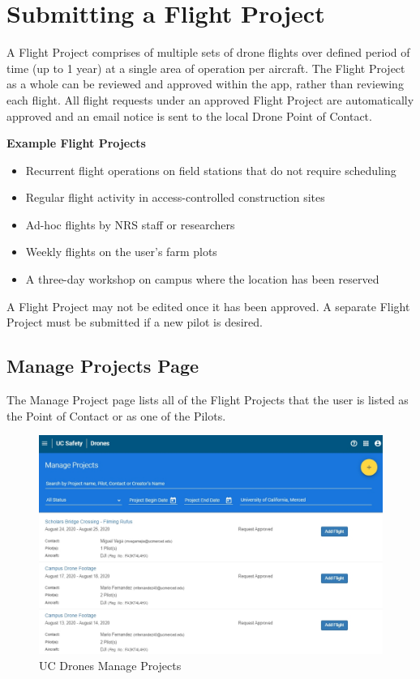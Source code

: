 \documentclass[
  12pt,
]{book}
\providecommand{\tightlist}{%
  \setlength{\itemsep}{0pt}\setlength{\parskip}{0pt}}
\begin{document}
\hypertarget{UCDrones-project}{%
\section{Submitting a Flight Project}\label{UCDrones-project}}

A Flight Project comprises of multiple sets of drone flights over defined period of time (up to 1 year) at a single area of operation per aircraft. The Flight Project as a whole can be reviewed and approved within the app, rather than reviewing each flight. All flight requests under an approved Flight Project are automatically approved and an email notice is sent to the local Drone Point of Contact.

\textbf{Example Flight Projects}

\begin{itemize}
\tightlist
\item
  Recurrent flight operations on field stations that do not require scheduling
\item
  Regular flight activity in access-controlled construction sites
\item
  Ad-hoc flights by NRS staff or researchers
\item
  Weekly flights on the user's farm plots
\item
  A three-day workshop on campus where the location has been reserved
\end{itemize}

A Flight Project may not be edited once it has been approved. A separate Flight Project must be submitted if a new pilot is desired.

\hypertarget{manage-projects-page}{%
\subsection{Manage Projects Page}\label{manage-projects-page}}

The Manage Project page lists all of the Flight Projects that the user is listed as the Point of Contact or as one of the Pilots.

\begin{figure}

{\centering \includegraphics[width=0.85\linewidth]{images/UCDrones_manage_project} 

}

\caption{UC Drones Manage Projects}\label{fig:UCDrones-project}
\end{figure}
\end{document}
